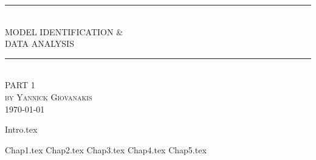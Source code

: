 \documentclass[12pt]{article} %
\begin{document}

\begin{titlepage}

\newcommand{\HRule}{\rule{\linewidth}{0.5mm}} %

\center %
\HRule \\[0.5cm]
{ \LARGE  MODEL IDENTIFICATION \& \\ DATA ANALYSIS}\\[0.8cm] %
\HRule \\[1.5cm]
\textsc{\large PART 1}\\[0.5cm] %
\textsc{\large by Yannick Giovanakis}\\[5.5cm] %

\vfill
{\large \today}\\[3cm] %
\end{titlepage}


\tableofcontents %

\newpage %

{Intro.tex}

\newpage
{Chap1.tex}
\newpage
{Chap2.tex}
\newpage
{Chap3.tex}
\newpage
 {Chap4.tex}
\newpage
 {Chap5.tex}
\end{document}
